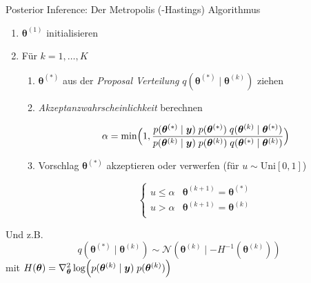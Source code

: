 \documentclass[
  ignorenonframetext,
  aspectratio=169,
]{beamer}
\providecommand{\tightlist}{%
  \setlength{\itemsep}{0pt}\setlength{\parskip}{0pt}}
\newcommand{\by}{\bm{y}}
\newcommand{\Ncal}{\mathcal{N}}
\newcommand{\btheta}{\bm{\theta}}
\begin{document}
\begin{frame}{Posterior Inference: Der Metropolis (-Hastings)
Algorithmus}
\protect{}\label{posterior-inference-der-metropolis--hastings-algorithmus}
\begin{enumerate}
\tightlist
\item
  \(\btheta^{(1)}\) initialisieren
\item
  Für \(k = 1, \dots, K\)

  \begin{enumerate}
  \item
    \(\btheta^{(*)}\) aus der \textit{Proposal Verteilung}
    \(q(\btheta^{(*)} \mid \btheta^{(k)})\) ziehen
  \item
    \textit{Akzeptanzwahrscheinlichkeit} berechnen

    \[
         \alpha = \min \Bigl(
             1, \frac{
                 p(\btheta^{(*)} \mid \by)\; p(\btheta^{(*)}) \; q(\btheta^{(k)} \mid \btheta^{(*)})}{
                     p(\btheta^{(k)} \mid \by)\; p(\btheta^{(k)}) \; q(\btheta^{(*)} \mid \btheta^{(k)})
                 }
             \Bigr)
     \]
  \item
    Vorschlag \(\btheta^{(*)}\) akzeptieren oder verwerfen (für
    \(u \sim \text{Uni}[0, 1]\))

    \[
     \begin{cases}
             u \le \alpha & \btheta^{(k+1)} = \btheta^{(*)}\\
             u > \alpha & \btheta^{(k+1)} = \btheta^{(k)}\\
     \end{cases}
     \]
  \end{enumerate}
\end{enumerate}

Und z.B. \[
q(\btheta^{(*)} \mid \btheta^{(k)}) \sim \Ncal(\btheta^{(k)} \mid -H^{-1}(\btheta^{(k)}))
\] mit
\(H(\btheta) = \nabla_{\btheta}^2  \log \Bigl(p(\btheta^{(k)} \mid \by)\; p(\btheta^{(k)})\Bigr)\)
\end{frame}
\end{document}
